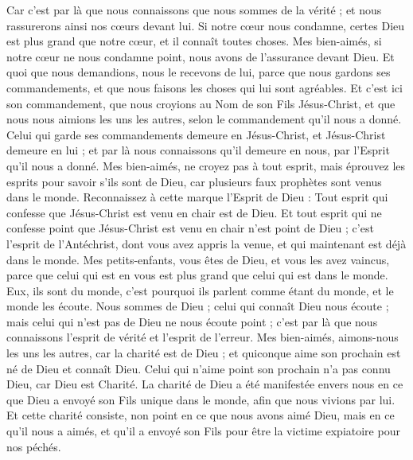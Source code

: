 \begin{multicols}{2}
Car c'est par là que nous connaissons que nous sommes de la vérité ; et nous rassurerons ainsi nos cœurs devant lui.
Si notre cœur nous condamne, certes Dieu est plus grand que notre cœur, et il connaît toutes choses.
Mes bien-aimés, si notre cœur ne nous condamne point, nous avons de l’assurance devant Dieu.
Et quoi que nous demandions, nous le recevons de lui, parce que nous gardons ses commandements, et que nous faisons les choses qui lui sont agréables.
Et c'est ici son commandement, que nous croyions au Nom de son Fils Jésus-Christ, et que nous nous aimions les uns les autres, selon le commandement qu’il nous a donné.
Celui qui garde ses commandements demeure en Jésus-Christ, et Jésus-Christ demeure en lui ; et par là nous connaissons qu'il demeure en nous, par l'Esprit qu'il nous a donné.
\VerseOne{}Mes bien-aimés, ne croyez pas à tout esprit, mais éprouvez les esprits pour savoir s'ils sont de Dieu, car plusieurs faux prophètes sont venus dans le monde.
Reconnaissez à cette marque l'Esprit de Dieu : Tout esprit qui confesse que Jésus-Christ est venu en chair est de Dieu.
Et tout esprit qui ne confesse point que Jésus-Christ est venu en chair n'est point de Dieu ; c’est l'esprit de l'Antéchrist, dont vous avez appris la venue, et qui maintenant est déjà dans le monde.
Mes petits-enfants, vous êtes de Dieu, et vous les avez vaincus, parce que celui qui est en vous est plus grand que celui qui est dans le monde.
Eux, ils sont du monde, c'est pourquoi ils parlent comme étant du monde, et le monde les écoute.
Nous sommes de Dieu ; celui qui connaît Dieu nous écoute ; mais celui qui n'est pas de Dieu ne nous écoute point ; c’est par là que nous connaissons l'esprit de vérité et l'esprit de l’erreur.
Mes bien-aimés, aimons-nous les uns les autres, car la charité est de Dieu ; et quiconque aime son prochain est né de Dieu et connaît Dieu.
Celui qui n'aime point son prochain n'a pas connu Dieu, car Dieu est Charité.
La charité de Dieu a été manifestée envers nous en ce que Dieu a envoyé son Fils unique dans le monde, afin que nous vivions par lui.
Et cette charité consiste, non point en ce que nous avons aimé Dieu, mais en ce qu'il nous a aimés, et qu'il a envoyé son Fils pour être la victime expiatoire pour nos péchés.

\end{multicols}
